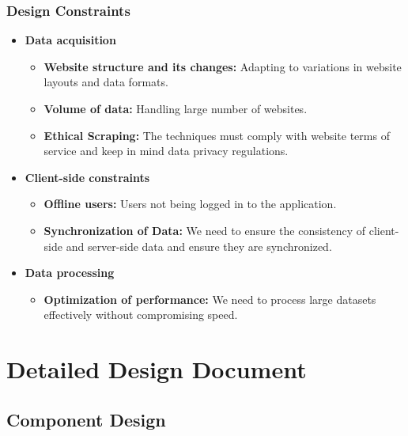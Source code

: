 \documentclass[a4paper,14pt,onecolumn]{report}
\begin{document}
	
	\subsection{Design Constraints}	
	\begin{itemize}
		\item \textbf{Data acquisition}
		\begin{itemize}
			\item \textbf{Website structure and its changes:} Adapting to variations in website layouts and data formats.
			\item \textbf{Volume of data:} Handling large number of websites.
			\item \textbf{Ethical Scraping:} The techniques must comply with website terms of service and keep in mind data privacy regulations.
		\end{itemize}
		\item \textbf{Client-side constraints}
		\begin{itemize}
			\item \textbf{Offline users:} Users not being logged in to the application.
			\item \textbf{Synchronization of Data:} We need to ensure the consistency of client-side and server-side data and ensure they are synchronized.
		\end{itemize}
		\item \textbf{Data processing}
		\begin{itemize}
			\item \textbf{Optimization of performance:} We need to process large datasets effectively without compromising speed.
		\end{itemize}
		
	\end{itemize}
	
	
	\chapter{Detailed Design Document}
	
	\section{Component Design} 
	
\end{document}

